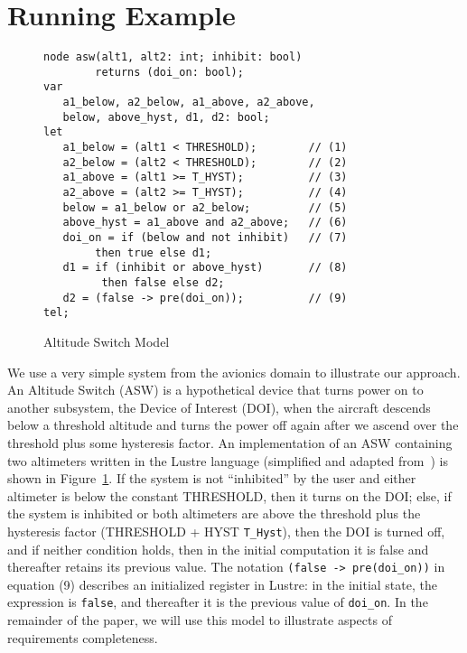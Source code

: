 \section{Running Example}
\label{sec:example}


\begin{figure}[t]
\centering
{\smaller
\begin{verbatim}
node asw(alt1, alt2: int; inhibit: bool)
        returns (doi_on: bool);
var
   a1_below, a2_below, a1_above, a2_above,
   below, above_hyst, d1, d2: bool;
let
   a1_below = (alt1 < THRESHOLD);        // (1)
   a2_below = (alt2 < THRESHOLD);        // (2)
   a1_above = (alt1 >= T_HYST);          // (3)
   a2_above = (alt2 >= T_HYST);          // (4)
   below = a1_below or a2_below;         // (5)
   above_hyst = a1_above and a2_above;   // (6)
   doi_on = if (below and not inhibit)   // (7)
        then true else d1;
   d1 = if (inhibit or above_hyst)       // (8)
         then false else d2;
   d2 = (false -> pre(doi_on));          // (9)
tel;
\end{verbatim}
}
\vspace{-0.1in}
\caption{Altitude Switch Model}
\vspace{-0.1in}
\label{fig:asw}
\end{figure}

We use a very simple system from the avionics domain to illustrate our approach. An Altitude Switch (ASW) is a hypothetical device that turns power on to another subsystem, the Device of Interest (DOI), when the aircraft descends below a threshold altitude and turns the power off again after we ascend over the threshold plus some hysteresis factor.  An implementation of an ASW containing two altimeters written in the Lustre language (simplified and adapted from~\cite{HCW02:ase-deviation}) is shown in Figure~\ref{fig:asw}.  If the system is not ``inhibited'' by the user and either altimeter is below the constant THRESHOLD, then it turns on the DOI; else, if the system is inhibited or both altimeters are above the threshold plus the hysteresis
factor {\small{(THRESHOLD + HYST \texttt{T\_Hyst})}}, then the DOI is turned off, and if neither condition holds, then in the initial computation it is false and thereafter retains its previous value.  The notation {\small{\texttt{(false -> pre(doi\_on))}}} in equation (9) describes an initialized register in Lustre: in the initial state, the expression is {\small{\texttt{false}}}, and thereafter it is the previous value of {\small{\texttt{doi\_on}}}.  In the remainder of the paper, we will use this model to illustrate aspects of requirements completeness.  %


